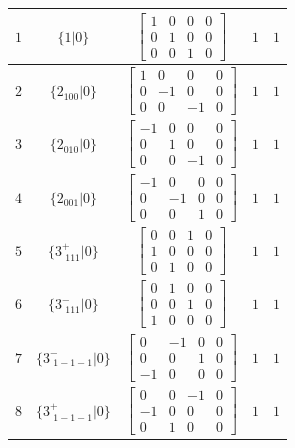 \documentclass[fleqn,8pt]{jsarticle}
\begin{document}
\begin{longtable}{ccccc}
$ 1 $ & $ \{1|0\} $ & $ \begin{bmatrix} 1 & 0 & 0 & 0 \\ 0 & 1 & 0 & 0 \\ 0 & 0 & 1 & 0 \end{bmatrix} $ & $ 1 $ & $ 1 $ \\ \hline
$ 2 $ & $ \{2{}_{100}|0\} $ & $ \begin{bmatrix} 1 & 0 & 0 & 0 \\ 0 & -1 & 0 & 0 \\ 0 & 0 & -1 & 0 \end{bmatrix} $ & $ 1 $ & $ 1 $ \\ \hline
$ 3 $ & $ \{2{}_{010}|0\} $ & $ \begin{bmatrix} -1 & 0 & 0 & 0 \\ 0 & 1 & 0 & 0 \\ 0 & 0 & -1 & 0 \end{bmatrix} $ & $ 1 $ & $ 1 $ \\ \hline
$ 4 $ & $ \{2{}_{001}|0\} $ & $ \begin{bmatrix} -1 & 0 & 0 & 0 \\ 0 & -1 & 0 & 0 \\ 0 & 0 & 1 & 0 \end{bmatrix} $ & $ 1 $ & $ 1 $ \\ \hline
$ 5 $ & $ \{3^{+}_{\,\,111}|0\} $ & $ \begin{bmatrix} 0 & 0 & 1 & 0 \\ 1 & 0 & 0 & 0 \\ 0 & 1 & 0 & 0 \end{bmatrix} $ & $ 1 $ & $ 1 $ \\ \hline
$ 6 $ & $ \{3^{-}_{\,\,111}|0\} $ & $ \begin{bmatrix} 0 & 1 & 0 & 0 \\ 0 & 0 & 1 & 0 \\ 1 & 0 & 0 & 0 \end{bmatrix} $ & $ 1 $ & $ 1 $ \\ \hline
$ 7 $ & $ \{3^{-}_{\,\,1-1-1}|0\} $ & $ \begin{bmatrix} 0 & -1 & 0 & 0 \\ 0 & 0 & 1 & 0 \\ -1 & 0 & 0 & 0 \end{bmatrix} $ & $ 1 $ & $ 1 $ \\ \hline
$ 8 $ & $ \{3^{+}_{\,\,1-1-1}|0\} $ & $ \begin{bmatrix} 0 & 0 & -1 & 0 \\ -1 & 0 & 0 & 0 \\ 0 & 1 & 0 & 0 \end{bmatrix} $ & $ 1 $ & $ 1 $ \\ \hline

\end{longtable}
\end{document}
